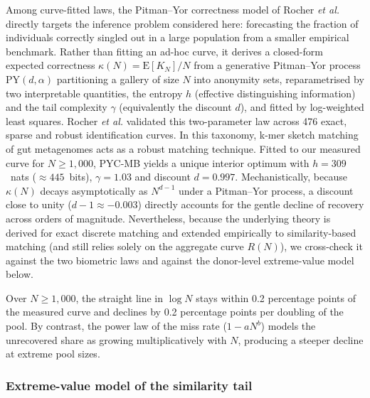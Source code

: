 \documentclass[11pt,a4paper]{article}
\begin{document}
Among curve-fitted laws, the Pitman--Yor correctness model of Rocher \textit{et al.}\cite{rocher2025} directly targets the inference problem considered here: forecasting the fraction of individuals correctly singled out in a large population from a smaller empirical benchmark. Rather than fitting an ad-hoc curve, it derives a closed-form expected correctness $\kappa(N) = \mathrm{E}[K_N]/N$ from a generative Pitman--Yor process $\mathrm{PY}(d, \alpha)$ partitioning a gallery of size $N$ into anonymity sets, reparametrised by two interpretable quantities, the entropy $h$ (effective distinguishing information) and the tail complexity $\gamma$ (equivalently the discount $d$), and fitted by log-weighted least squares. Rocher \textit{et al.} validated this two-parameter law across 476 exact, sparse and robust identification curves. In this taxonomy, k-mer sketch matching of gut metagenomes acts as a robust matching technique. Fitted to our measured curve for $N \ge 1{,}000$, PYC-MB yields a unique interior optimum with $h = 309$~nats ($\approx 445$~bits), $\gamma = 1.03$ and discount $d = 0.997$. Mechanistically, because $\kappa(N)$ decays asymptotically as $N^{d-1}$ under a Pitman--Yor process, a discount close to unity ($d - 1 \approx -0.003$) directly accounts for the gentle decline of recovery across orders of magnitude. Nevertheless, because the underlying theory is derived for exact discrete matching and extended empirically to similarity-based matching (and still relies solely on the aggregate curve $R(N)$), we cross-check it against the two biometric laws and against the donor-level extreme-value model below.

Over $N \ge 1{,}000$, the straight line in $\log N$ stays within 0.2 percentage points of the measured curve and declines by 0.2 percentage points per doubling of the pool. By contrast, the power law of the miss rate ($1 - a N^{b}$) models the unrecovered share as growing multiplicatively with $N$, producing a steeper decline at extreme pool sizes.

\subsubsection*{Extreme-value model of the similarity tail}
\end{document}

